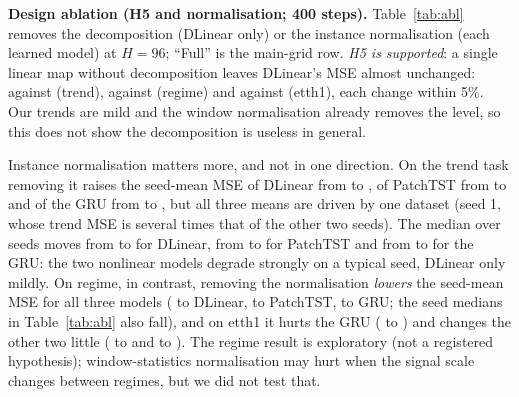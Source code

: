 \textbf{Design ablation (H5 and normalisation; 400 steps).} Table~\ref{tab:abl} removes the decomposition (DLinear only) or the instance normalisation (each learned model) at $H=96$; ``Full'' is the main-grid row. \emph{H5 is supported}: a single linear map without decomposition leaves DLinear's MSE almost unchanged:  against  (trend),  against  (regime) and  against  (etth1), each change within 5\%. Our trends are mild and the window normalisation already removes the level, so this does not show the decomposition is useless in general.

Instance normalisation matters more, and not in one direction. On the trend task removing it raises the seed-mean MSE of DLinear from  to , of PatchTST from  to  and of the GRU from  to , but all three means are driven by one dataset (seed 1, whose trend MSE is several times that of the other two seeds). The median over seeds moves from  to  for DLinear, from  to  for PatchTST and from  to  for the GRU: the two nonlinear models degrade strongly on a typical seed, DLinear only mildly. On regime, in contrast, removing the normalisation \emph{lowers} the seed-mean MSE for all three models ( to  DLinear,  to  PatchTST,  to  GRU; the seed medians in Table~\ref{tab:abl} also fall), and on etth1 it hurts the GRU ( to ) and changes the other two little ( to  and  to ). The regime result is exploratory (not a registered hypothesis); window-statistics normalisation may hurt when the signal scale changes between regimes, but we did not test that.

